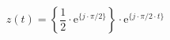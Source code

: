 \[
z(t) =  \left \{ \frac{1}{2} \cdot \textrm{e}^{\{j \cdot \pi/2 \}} \right \} \cdot \textrm{e}^{\{ j \cdot \pi/2 \cdot t \}}
\]
